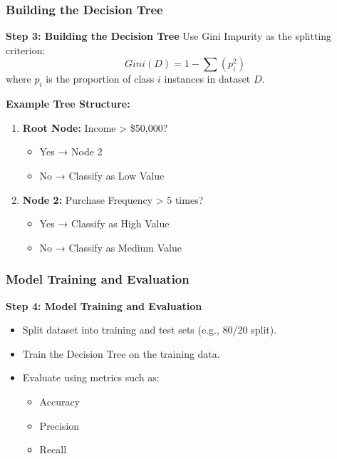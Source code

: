 \documentclass{beamer}
\begin{document}
\begin{frame}[fragile]
    \frametitle{Building the Decision Tree}
    \textbf{Step 3: Building the Decision Tree}  
    Use Gini Impurity as the splitting criterion:  
    \begin{equation}
    Gini(D) = 1 - \sum (p_i^2)
    \end{equation}  
    where \( p_i \) is the proportion of class \( i \) instances in dataset \( D \).
    
    \textbf{Example Tree Structure:}
    \begin{enumerate}
        \item \textbf{Root Node:} Income > \$50,000?
        \begin{itemize}
            \item Yes → Node 2
            \item No → Classify as Low Value
        \end{itemize}
        \item \textbf{Node 2:} Purchase Frequency > 5 times?
        \begin{itemize}
            \item Yes → Classify as High Value
            \item No → Classify as Medium Value
        \end{itemize}
    \end{enumerate}
\end{frame}

\begin{frame}[fragile]
    \frametitle{Model Training and Evaluation}
    \textbf{Step 4: Model Training and Evaluation}
    \begin{itemize}
        \item Split dataset into training and test sets (e.g., 80/20 split).
        \item Train the Decision Tree on the training data.
        \item Evaluate using metrics such as:
        \begin{itemize}
            \item Accuracy
            \item Precision
            \item Recall
        \end{itemize}
    \end{itemize}
\end{frame}
\end{document}
